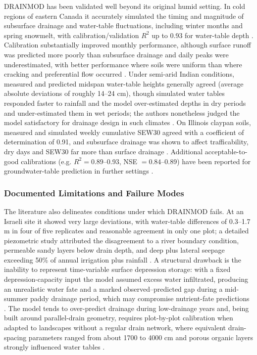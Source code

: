 \textsc{DRAINMOD} has been validated well beyond its original humid setting. In cold regions of eastern Canada it accurately simulated the timing and magnitude of subsurface drainage and water-table fluctuations, including winter months and spring snowmelt, with calibration/validation $R^2$ up to 0.93 for water-table depth \parencite{Dayyani2009,Morrison2014}. Calibration substantially improved monthly performance, although surface runoff was predicted more poorly than subsurface drainage and daily peaks were underestimated, with better performance where soils were uniform than where cracking and preferential flow occurred \parencite{Morrison2014}. Under semi-arid Indian conditions, measured and predicted midspan water-table heights generally agreed (average absolute deviations of roughly 14--24 cm), though simulated water tables responded faster to rainfall and the model over-estimated depths in dry periods and under-estimated them in wet periods; the authors nonetheless judged the model satisfactory for drainage design in such climates \parencite{GUPTA1993}. On Illinois claypan soils, measured and simulated weekly cumulative SEW30 agreed with a coefficient of determination of 0.91, and subsurface drainage was shown to affect trafficability, dry days and SEW30 far more than surface drainage \parencite{MOSTAGHIMI1989}. Additional acceptable-to-good calibrations (e.g. $R^2=0.89$--0.93, NSE $=0.84$--0.89) have been reported for groundwater-table prediction in further settings \parencite{Abduljaleel2023,Awad2022b}.

\subsubsection{Documented Limitations and Failure Modes}

The literature also delineates conditions under which \textsc{DRAINMOD} fails. At an Israeli site it showed very large deviations, with water-table differences of 0.3--1.7 m in four of five replicates and reasonable agreement in only one plot; a detailed piezometric study attributed the disagreement to a river boundary condition, permeable sandy layers below drain depth, and deep plus lateral seepage exceeding 50\% of annual irrigation plus rainfall \parencite{Sinai2006}. A structural drawback is the inability to represent time-variable surface depression storage: with a fixed depression-capacity input the model assumed excess water infiltrated, producing an unrealistic water fate and a marked observed--predicted gap during a mid-summer paddy drainage period, which may compromise nutrient-fate predictions \parencite{Abduljaleel2023}. The model tends to over-predict drainage during low-drainage years \parencite{Singh2006b} and, being built around parallel-drain geometry, requires plot-by-plot calibration when adapted to landscapes without a regular drain network, where equivalent drain-spacing parameters ranged from about 1700 to 4000 cm and porous organic layers strongly influenced water tables \parencite{He2002}.

